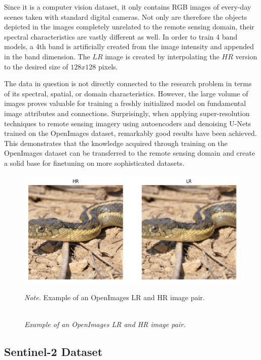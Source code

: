 Since it is a computer vision dataset, it only contains RGB images of every-day scenes taken with standard digital cameras. Not only are therefore the objects depicted in the images completely unrelated to the remote sensing domain, their spectral characteristics are vastly different as well. In order to train 4 band models, a 4th band is artificially created from the image intensity and appended in the band dimension. The $LR$ image is created by interpolating the $HR$ version to the desired size of $128x128$ pixels.

The data in question is not directly connected to the research problem in terms of its spectral, spatial, or domain characteristics. However, the large volume of images proves valuable for training a freshly initialized model on fundamental image attributes and connections. Surprisingly, when applying super-resolution techniques to remote sensing imagery using autoencoders and denoising U-Nets trained on the OpenImages dataset, remarkably good results have been achieved. This demonstrates that the knowledge acquired through training on the OpenImages dataset can be transferred to the remote sensing domain and create a solid base for finetuning on more sophisticated datasets.

\begin{figure}[H] 
    \caption{\doublespacing \\ \textit{Example of an OpenImages LR and HR image pair.}} 
    \centering
    \includegraphics[width=1\linewidth]{images/openimages_example.png}
    \begin{justify}
        \textit{Note.} Example of an OpenImages LR and HR image pair.
    \end{justify}                    
    \label{fig:openimages_example}
\end{figure}

\subsection{Sentinel-2 Dataset}



